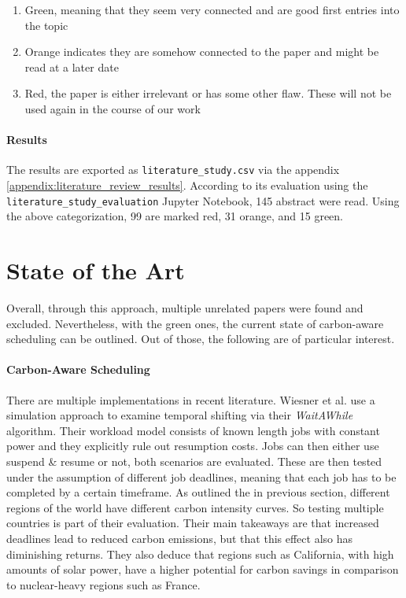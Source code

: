 \begin{enumerate}
    \item Green, meaning that they seem very connected and are good first entries into the topic
    \item Orange indicates they are somehow connected to the paper and might be read at a later date
    \item Red, the paper is either irrelevant or has some other flaw. These will not be used again in the course of our work
\end{enumerate}

\paragraph{Results}

The results are exported as \verb|literature_study.csv| via the appendix \ref{appendix:literature_review_results}. 
According to its evaluation using the \verb|literature_study_evaluation| Jupyter Notebook, 145 abstract were read. 
Using the above categorization, 99 are marked red, 31 orange, and 15 green.

\section{State of the Art} \label{sec:state_of_the_art}

Overall, through this approach, multiple unrelated papers were found and excluded.
Nevertheless, with the green ones, the current state of carbon-aware scheduling can be outlined.
Out of those, the following are of particular interest.

\paragraph{Carbon-Aware Scheduling}
There are multiple implementations in recent literature. Wiesner et al. \cite{wiesner_lets_2021} use a simulation approach to examine temporal shifting via their \emph{WaitAWhile} algorithm. 
Their workload model consists of known length jobs with constant power and they explicitly rule out resumption costs. 
Jobs can then either use suspend \& resume or not, both scenarios are evaluated. 
These are then tested under the assumption of different job deadlines, meaning that each job has to be completed by a certain timeframe. 
As outlined the in previous section, different regions of the world have different carbon intensity curves. 
So testing multiple countries is part of their evaluation.
Their main takeaways are that increased deadlines lead to reduced carbon emissions, but that this effect also has diminishing returns. 
They also deduce that regions such as California, with high amounts of solar power, have a higher potential for carbon savings in comparison to nuclear-heavy regions such as France.

